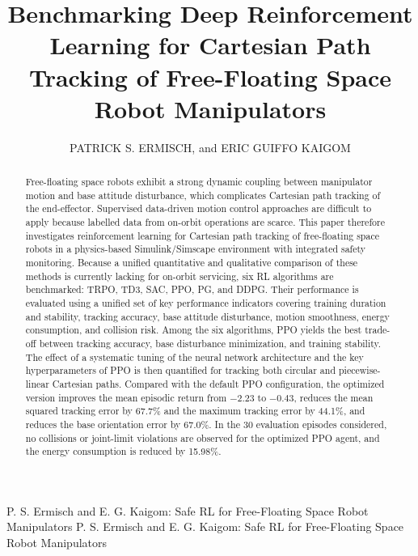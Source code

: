 \documentclass{ieeeaccess}
\begin{document}

\title{Benchmarking  Deep Reinforcement Learning for Cartesian Path Tracking  of Free-Floating Space Robot Manipulators}
\author{\uppercase{Patrick S. Ermisch}, and 
\uppercase{Eric Guiffo Kaigom} }
\address[1]{Department of Computer Science \& Engineering, Frankfurt University of Applied Sciences, Frankfurt am Main, Germany \\(e-mail: steven.ermisch@stud.fra-uas.de, kaigom@fra-uas.de)}

\markboth
{P. S. Ermisch and E. G. Kaigom: Safe RL for Free-Floating Space Robot Manipulators}
{P. S. Ermisch and E. G. Kaigom: Safe RL for Free-Floating Space Robot Manipulators}


\begin{abstract}
Free-floating space robots exhibit a strong dynamic coupling between manipulator motion and base attitude disturbance,
which complicates Cartesian path tracking of the end-effector.
Supervised data-driven motion control approaches are difficult to apply because labelled data from on-orbit 
operations are scarce. This paper therefore investigates reinforcement learning for Cartesian path tracking 
of free-floating space robots in a physics-based Simulink/Simscape environment with integrated safety monitoring. 
Because a unified quantitative and qualitative comparison of these methods is currently lacking for on-orbit 
servicing, six RL algorithms are benchmarked: TRPO, TD3, SAC, PPO, PG, and DDPG. Their performance is evaluated 
using a unified set of key performance indicators covering training duration and stability, tracking 
accuracy, base attitude disturbance, motion smoothness, energy consumption, and collision risk. Among the six 
algorithms, PPO yields the best trade-off between tracking accuracy, base disturbance minimization, and training stability.
The effect of a systematic tuning of the neural network architecture and the key hyperparameters of PPO is then 
quantified for tracking both circular and piecewise-linear Cartesian paths.
Compared with the default PPO configuration, the optimized version improves the mean episodic return 
from $-2.23$ to $-0.43$, reduces the mean squared tracking error by 67.7\% and the maximum tracking error by 
44.1\%, and reduces the base orientation error by 67.0\%. In the 30 evaluation episodes considered, no 
collisions or joint-limit violations are observed for the optimized PPO agent, and the energy consumption is 
reduced by 15.98\%.
\end{abstract}
\end{document}
